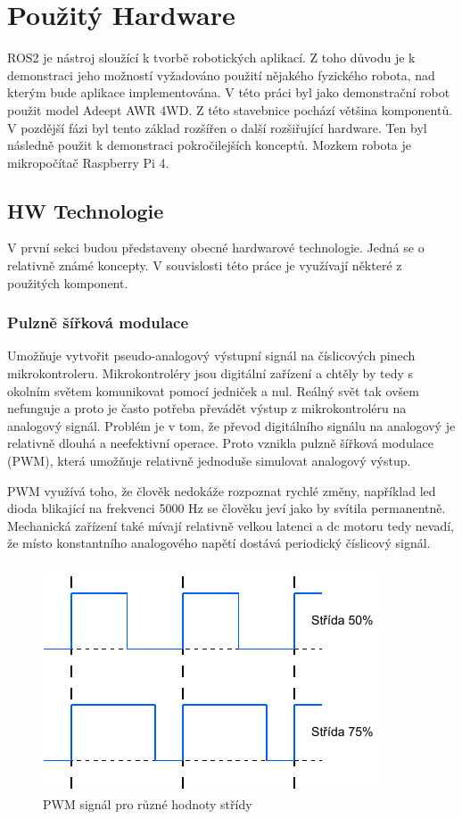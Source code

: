 \chapter{Použitý Hardware}
ROS2 je nástroj sloužící k tvorbě robotických aplikací. Z toho důvodu je k demonstraci jeho možností vyžadováno použití nějakého fyzického robota, nad kterým bude aplikace implementována. V této práci byl jako demonstrační robot použit model Adeept AWR 4WD. Z této stavebnice pochází většina komponentů. V pozdější fázi byl tento základ rozšířen o další rozšiřující hardware. Ten byl následně použit k demonstraci pokročilejších konceptů. Mozkem robota je mikropočítač Raspberry Pi 4.

\section{HW Technologie}
V první sekci budou představeny obecné hardwarové technologie. Jedná se o relativně známé koncepty. V souvislosti této práce je využívají některé z použitých komponent.

\subsection*{Pulzně šířková modulace} 
Umožňuje vytvořit pseudo-analogový výstupní signál na číslicových pinech mikrokontroleru. Mikrokontroléry jsou digitální zařízení a chtěly by tedy s okolním světem komunikovat pomocí jedniček a nul. Reálný svět tak ovšem nefunguje a proto je často potřeba převádět výstup z mikrokontroléru na analogový signál. Problém je v tom, že převod digitálního signálu na analogový je relativně dlouhá a neefektivní operace. Proto vznikla pulzně šířková modulace (PWM), která umožňuje relativně jednoduše simulovat analogový výstup.

PWM využívá toho, že člověk nedokáže rozpoznat rychlé změny, například led dioda blikající na frekvenci 5000 Hz se člověku jeví jako by svítila permanentně. Mechanická zařízení také mívají relativně velkou latenci a dc motoru tedy nevadí, že místo konstantního analogového napětí dostává periodický číslicový signál.

\newpage

\begin{figure}[h!]
	\centering
	\includegraphics[scale=1.1]{obrazky-figures/pwm_duty_cycle.pdf}
	\caption{PWM signál pro různé hodnoty střídy}
	\label{}
\end{figure}


